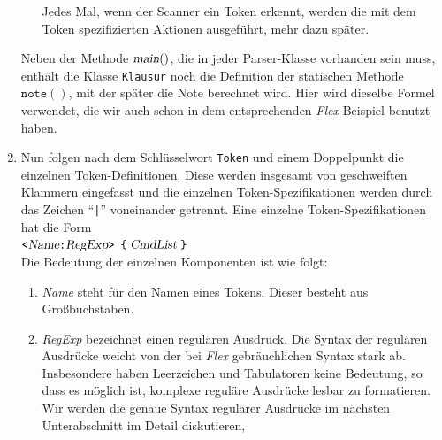 \begin{enumerate}
\begin{enumerate}
            Jedes Mal, wenn der Scanner ein Token erkennt, werden die mit dem Token
            spezifizierten Aktionen ausgef\"uhrt, mehr dazu sp\"ater.
      \end{enumerate}
      Neben der Methode $\textsl{main}()$, die in jeder Parser-Klasse vorhanden
      sein muss, enth\"alt die Klasse \texttt{Klausur} noch die Definition der statischen
      Methode $\texttt{note}()$, mit der sp\"ater die Note berechnet wird.  Hier
      wird dieselbe Formel verwendet, die wir auch schon in dem entsprechenden
      \textsl{Flex}-Beispiel benutzt haben.
\item Nun folgen nach dem Schl\"usselwort \texttt{Token} und einem Doppelpunkt die
      einzelnen Token-Definitionen.  Diese werden insgesamt von geschweiften Klammern
      eingefasst und die einzelnen Token-Spezifikationen werden durch das
      Zeichen ``\texttt{|}'' voneinander getrennt.  Eine einzelne Token-Spezifikationen hat die
      Form
      \\[0.2cm]
      \hspace*{1.3cm} $\texttt{<}\textsl{Name}\texttt{:} \textsl{RegExp}\texttt{>}$ $\texttt{\{} \;\textsl{CmdList}\; \texttt{\}}$
      \\[0.2cm]
      Die Bedeutung der einzelnen Komponenten ist wie folgt:
      \begin{enumerate}
      \item \textsl{Name}\/ steht f\"ur den Namen eines Tokens.  Dieser besteht aus
            Gro{\ss}buchstaben.  
      \item \textsl{RegExp}\/ bezeichnet einen regul\"aren Ausdruck.  Die Syntax der
            regul\"aren Ausdr\"ucke weicht von der bei \textsl{Flex}\/ gebr\"auchlichen
            Syntax stark ab.  Insbesondere haben Leerzeichen und Tabulatoren keine
            Bedeutung, so dass es m\"oglich ist, komplexe regul\"are Ausdr\"ucke lesbar zu
            formatieren.  Wir werden die genaue Syntax regul\"arer Ausdr\"ucke im n\"achsten
            Unterabschnitt im Detail diskutieren,
            

\end{enumerate}
\end{enumerate}
